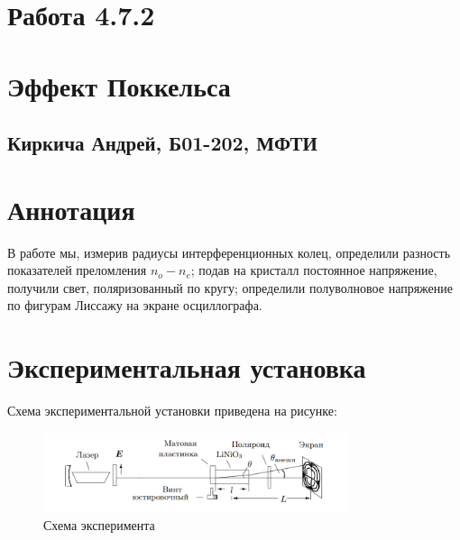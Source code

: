 
\newcommand{\specialcell}[2][c]{%
	\begin{tabular}[#1]{@{}c@{}}#2\end{tabular}}

\newcommand{\mA}{\; мА}
\newcommand{\uA}{\; мкА}
\newcommand{\uV}{\; мкВ}
\newcommand{\V}{\; В}
\newcommand{\kV}{\; кВ}
\newcommand{\m}{\; м}
\newcommand{\del}{\; дел}
\newcommand{\mm}{\; мм}
\newcommand{\um}{\; мкм}
\newcommand{\nm}{\; нм}
\newcommand{\cm}{\; см}
\newcommand{\dptr}{\; дптр}
	

\section*{Работа 4.7.2}	
\section*{Эффект Поккельса}
\subsection*{Киркича Андрей, Б01-202, МФТИ}		
\section*{Аннотация}
В работе мы, измерив радиусы интерференционных колец, определили разность показателей преломления $n_o - n_e$; подав на кристалл постоянное напряжение, получили свет, поляризованный по кругу; определили полуволновое напряжение по фигурам Лиссажу на экране осциллографа.
\section*{Экспериментальная установка}

Схема экспериментальной установки приведена на рисунке:

\begin{figure}[H]
	\centering
	\includegraphics[width=0.8\textwidth]{Изображения/ust.png}
	\caption{Схема эксперимента}
\end{figure}

